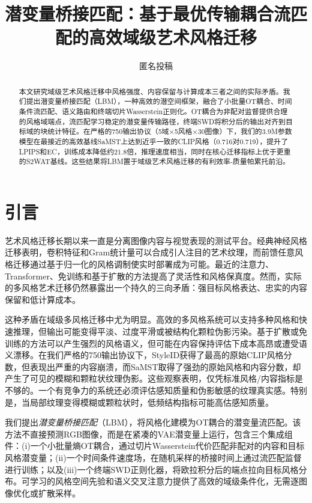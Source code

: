 ﻿\documentclass[letterpaper]{article}
\title{潜变量桥接匹配：基于最优传输耦合流匹配的高效域级艺术风格迁移}
\author{匿名投稿}
\begin{document}
\maketitle

\begin{abstract}
本文研究域级艺术风格迁移中风格强度、内容保留与计算成本三者之间的实际矛盾。我们提出潜变量桥接匹配（LBM），一种高效的潜空间框架，融合了小批量OT耦合、时间条件流匹配、语义路由和终端切片Wasserstein正则化。OT耦合为非配对监督提供合理的风格域端点，流匹配学习稳定的潜变量传输路径，终端SWD将积分后的输出对齐到目标域的块统计特征。在严格的750输出协议（5域×5风格×30图像）下，我们的3.9M参数模型在最接近的高效基线SaMST上达到近乎一致的CLIP风格（0.716对0.719），提升了LPIPS和EC，训练成本降低约21.8倍，推理速度相当，同时在核心迁移指标上优于更重的S2WAT基线。这些结果将LBM置于域级艺术风格迁移的有利效率-质量帕累托前沿。
\end{abstract}

\section{引言}
艺术风格迁移长期以来一直是分离图像内容与视觉表现的测试平台。经典神经风格迁移表明，卷积特征和Gram统计量可以合成引人注目的艺术纹理\cite{gatys2016image}，而前馈任意风格迁移通过基于归一化的风格调制使实时部署成为可能\cite{huang2017adain}。最近的注意力、Transformer、免训练和基于扩散的方法提高了灵活性和风格保真度\cite{park2019sanet,deng2022stytr2,hong2023aespa,huang2024aesfa,gim2024cast,chung2024styleid}。然而，实际的多风格艺术迁移仍然暴露出一个持久的三向矛盾：强目标风格表达、忠实的内容保留和低计算成本。

这种矛盾在域级多风格迁移中尤为明显。高效的多风格系统可以支持多种风格和快速推理，但输出可能变得平淡、过度平滑或被结构化颗粒伪影污染。基于扩散或免训练的方法可以产生强烈的风格语义，但可能在内容保持评估下成本高昂或遭受语义漂移。在我们严格的750输出协议下，StyleID获得了最高的原始CLIP风格分数，但表现出严重的内容崩溃，而SaMST取得了强劲的原始风格和内容分数，却产生了可见的模糊和颗粒状纹理伪影。这些观察表明，仅凭标准风格/内容指标是不够的。一个有竞争力的系统还必须评估感知质量和伪影敏感的纹理真实感。特别是，当局部纹理变得模糊或颗粒状时，低频结构指标可能高估感知质量。

我们提出\emph{潜变量桥接匹配}（LBM），将风格化建模为OT耦合的潜变量流匹配。该方法不直接预测RGB图像，而是在紧凑的VAE潜变量上运行，包含三个集成组件：(i)一个小批量熵OT耦合，通过切片Wasserstein代价匹配非配对的内容和目标风格潜变量；(ii)一个时间条件速度场，在随机采样的桥接时间上通过流匹配监督进行训练；以及(iii)一个终端SWD正则化器，将欧拉积分后的端点拉向目标风格分布。可学习的风格空间先验和语义交叉注意力提供了高效的域级条件化，无需逐图像优化或扩散采样。
\end{document}

